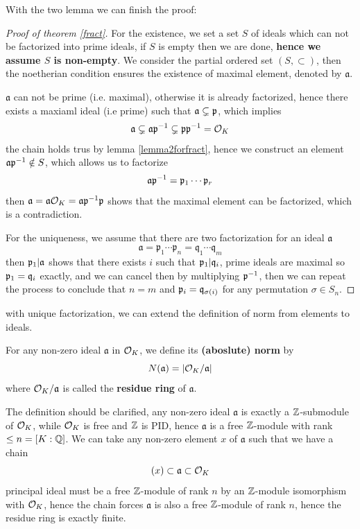 With the two lemma we can finish the proof:
\begin{proof}[Proof of theorem \ref{fract}]
    For the existence, we set a set \(S\) of ideals which can not be factorized into prime ideals, if \(S\) is empty then we are done, \textbf{hence we assume \(S\) is non-empty}. We consider the partial ordered set \((S,\subset)\), then the noetherian condition ensures the existence of maximal element, denoted by \(\mathfrak{a}\).

    \(\mathfrak{a}\) can not be prime (i.e. maximal), otherwise it is already factorized, hence there exists a maxiaml ideal (i.e prime) such that \(\mathfrak{a} \subsetneq \mathfrak{p}\), which implies
    \[\mathfrak{a} \subsetneq \mathfrak{a}\mathfrak{p}^{-1} \subsetneq \mathfrak{p}\mathfrak{p}^{-1} = \mathcal{O}_K \]
    the chain holds trus by lemma \ref{lemma2forfract}, hence we construct an element \(\mathfrak{a}\mathfrak{p}^{-1} \notin S\), which allows us to factorize
    \[\mathfrak{a}\mathfrak{p}^{-1} = \mathfrak{p}_1 \cdots \mathfrak{p}_r\]
    then \(\mathfrak{a} = \mathfrak{a}\mathcal{O}_K = \mathfrak{a}\mathfrak{p}^{-1}\mathfrak{p}\) shows that the maximal element can be factorized, which is a contradiction.

    For the uniqueness, we assume that there are two factorization for an ideal \(\mathfrak{a}\)
    \[\mathfrak{a} = \mathfrak{p}_1\cdots \mathfrak{p}_n = \mathfrak{q}_1 \cdots \mathfrak{q}_m\] 
    then \(\mathfrak{p}_1 | \mathfrak{a}\) shows that there exists \(i\) such that \(\mathfrak{p}_1 | \mathfrak{q}_i\), prime ideals are maximal so \(\mathfrak{p}_1 = \mathfrak{q}_i\) exactly, and we can cancel then by multiplying \(\mathfrak{p}^{-1}\), then we can repeat the process to conclude that \(n=m\) and \(\mathfrak{p}_i = \mathfrak{q}_{\sigma(i)}\) for any permutation \(\sigma \in S_n\).
\end{proof}

with unique factorization, we can extend the definition of norm from elements to ideals.

\begin{colordefinition}
    For any non-zero ideal \(\mathfrak{a}\) in \(\mathcal{O}_K\), we define its \textbf{(aboslute) norm} by
    \[N(\mathfrak{a}) = |\mathcal{O}_K / \mathfrak{a}|\]
    where \(\mathcal{O}_K/\mathfrak{a}\) is called the \textbf{residue ring} of \(\mathfrak{a}\). 
\end{colordefinition}

\begin{remark}
    The definition should be clarified, any non-zero ideal \(\mathfrak{a}\) is exactly a \(\mathbb{Z}\)-submodule of \(\mathcal{O}_K\), while \(\mathcal{O}_K\) is free and \(\mathbb{Z}\) is PID, hence \(\mathfrak{a}\) is a free \(\mathbb{Z}\)-module with rank \(\leq n = [K:\mathbb{Q}]\). We can take any non-zero element \(x\) of \(\mathfrak{a}\) such that we have a chain 
    \[(x) \subset \mathfrak{a} \subset \mathcal{O}_K\]
    principal ideal must be a free \(\mathbb{Z}\)-module of rank \(n\) by an \(\mathbb{Z}\)-module isomorphism with \(\mathcal{O}_K\), hence the chain forces \(\mathfrak{a}\) is also a free \(\mathbb{Z}\)-module of rank \(n\), hence the residue ring is exactly finite.
\end{remark}

